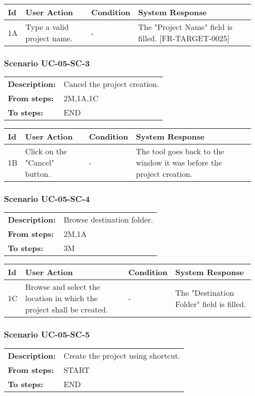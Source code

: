 \documentclass[a4paper,11pt]{article}
\newcommand{\bl}{\\ \hline}
\begin{document}
\begin{tabular}{|p{0.8in}|p{1.6in}|p{1.6in}|p{1.6in}|}
\hline
Id & User Action & Condition & System Response  \bl 
1A & Type a valid project name. & - & The "Project Name" field is filled. [FR-TARGET-0025] \bl 
\end{tabular}
\subsubsection*{Scenario UC-05-SC-3}
\begin{tabular}{p{1in}p{4in}}
{\bf Description:} & Cancel the project creation. \\
{\bf From steps:} & 2M,1A,1C \\
{\bf To steps:} & END \\
\end{tabular}
 
\begin{tabular}{|p{0.8in}|p{1.6in}|p{1.6in}|p{1.6in}|}
\hline
Id & User Action & Condition & System Response  \bl 
1B & Click on the "Cancel" button. & - & The tool goes back to the window it was before the project creation. \bl 
\end{tabular}
\subsubsection*{Scenario UC-05-SC-4}
\begin{tabular}{p{1in}p{4in}}
{\bf Description:} & Browse destination folder. \\
{\bf From steps:} & 2M,1A \\
{\bf To steps:} & 3M \\
\end{tabular}
 
\begin{tabular}{|p{0.8in}|p{1.6in}|p{1.6in}|p{1.6in}|}
\hline
Id & User Action & Condition & System Response  \bl 
1C & Browse and select the location in which the project shall be created. & - & The "Destination Folder" field is filled. \bl 
\end{tabular}
\subsubsection*{Scenario UC-05-SC-5}
\begin{tabular}{p{1in}p{4in}}
{\bf Description:} & Create the project using shortcut. \\
{\bf From steps:} & START \\
{\bf To steps:} & END \\
\end{tabular}
 
\end{document}
